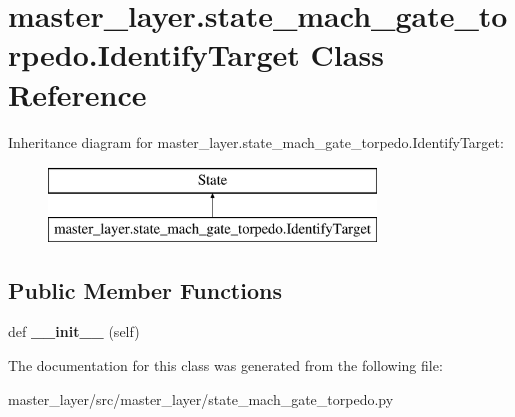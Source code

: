 \hypertarget{classmaster__layer_1_1state__mach__gate__torpedo_1_1IdentifyTarget}{}\section{master\+\_\+layer.\+state\+\_\+mach\+\_\+gate\+\_\+torpedo.\+Identify\+Target Class Reference}
\label{classmaster__layer_1_1state__mach__gate__torpedo_1_1IdentifyTarget}
Inheritance diagram for master\+\_\+layer.\+state\+\_\+mach\+\_\+gate\+\_\+torpedo.\+Identify\+Target\+:\begin{figure}[H]
\begin{center}
\leavevmode
\includegraphics[height=2.000000cm]{classmaster__layer_1_1state__mach__gate__torpedo_1_1IdentifyTarget}
\end{center}
\end{figure}
\subsection*{Public Member Functions}
\begin{DoxyCompactItemize}
\item 
\mbox{\label{classmaster__layer_1_1state__mach__gate__torpedo_1_1IdentifyTarget_a430f7d239c95a4a1a7f6d07204abeed9}} 
def {\bfseries \+\_\+\+\_\+init\+\_\+\+\_\+} (self)
\end{DoxyCompactItemize}


The documentation for this class was generated from the following file\+:\begin{DoxyCompactItemize}
\item 
master\+\_\+layer/src/master\+\_\+layer/state\+\_\+mach\+\_\+gate\+\_\+torpedo.\+py\end{DoxyCompactItemize}
